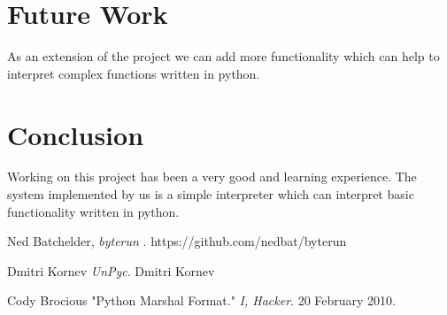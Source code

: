 \documentclass[10pt,a4paper]{article}
\begin{document}
\section{Future Work}
As an extension of the project we can add more functionality which can help to interpret complex functions written in python.

\section{Conclusion}
Working on this project has been a very good and learning  experience. The system implemented by us is a simple interpreter which can interpret basic functionality written in python.

\begin{thebibliography}{9}

  Ned Batchelder,
  \emph{byterun }.
  https://github.com/nedbat/byterun

Dmitri Kornev
\emph{UnPyc}.
Dmitri Kornev

Cody Brocious
"Python Marshal Format." \emph{I, Hacker}. 20 February 2010.

\end{thebibliography}
\end{document}
